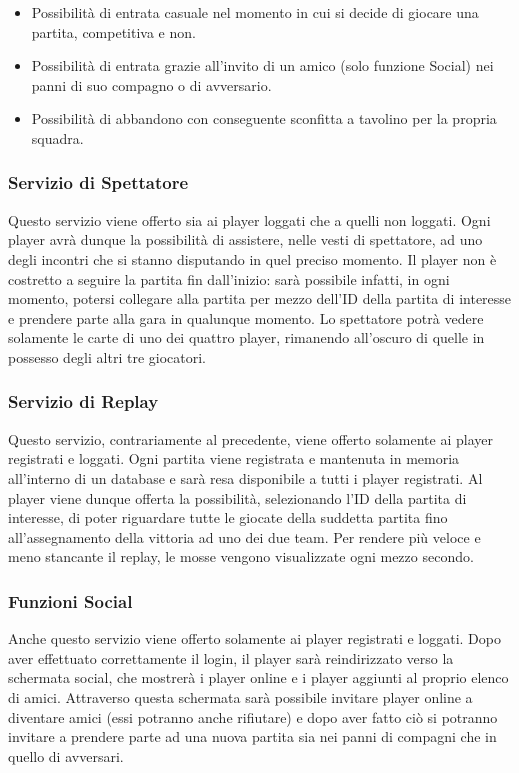             \begin {itemize}
            \item Possibilità di entrata casuale nel momento in cui si decide di giocare una partita, competitiva e non.
            \item Possibilità di entrata grazie all'invito di un amico (solo funzione Social) nei panni di suo compagno o di avversario.
            \item Possibilità di abbandono con conseguente sconfitta a tavolino per la propria squadra.
            \end {itemize}
            
            \subsubsection[Servizio di Spettatore]{\large {Servizio di Spettatore}\label{subsub:requirements:viewer}}
            Questo servizio viene offerto sia ai player loggati che a quelli non loggati. Ogni player avrà dunque la possibilità di assistere, nelle vesti di spettatore, ad uno degli incontri che si stanno disputando in quel preciso momento. Il player non è costretto a seguire la partita fin dall'inizio: sarà possibile infatti, in ogni momento, potersi collegare alla partita per mezzo dell'ID della partita di interesse e prendere parte alla gara in qualunque momento. Lo spettatore potrà vedere solamente le carte di uno dei quattro player, rimanendo all'oscuro di quelle in possesso degli altri tre giocatori.
            
            \subsubsection[Servizio di Replay]{\large {Servizio di Replay}\label{subsub:requirements:replay}}
            Questo servizio, contrariamente al precedente, viene offerto solamente ai player registrati e loggati. Ogni partita viene registrata e mantenuta in memoria all'interno di un database e sarà resa disponibile a tutti i player registrati. Al player viene dunque offerta la possibilità, selezionando l'ID della partita di interesse, di poter riguardare tutte le giocate della suddetta partita fino all'assegnamento della vittoria ad uno dei due team. Per rendere più veloce e meno stancante il replay, le mosse vengono visualizzate ogni mezzo secondo.
                        
             \subsubsection[Funzioni Social]{\large {Funzioni Social}\label{subsub:requirements:social}}
             Anche questo servizio viene offerto solamente ai player registrati e loggati. Dopo aver effettuato correttamente il login, il player sarà reindirizzato verso la schermata social, che mostrerà i player online e i player aggiunti al proprio elenco di amici. Attraverso questa schermata sarà possibile invitare player online a diventare amici (essi potranno anche rifiutare) e dopo aver fatto ciò si potranno invitare a prendere parte ad una nuova partita sia nei panni di compagni che in quello di avversari. 
               
